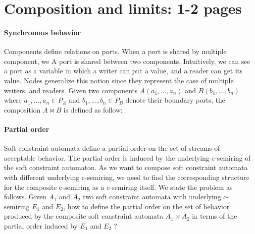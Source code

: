 \section{Composition and limits: 1-2 pages}
\paragraph{Synchronous behavior} Components define relations on ports. When a port is shared by multiple component, we 
A port is shared between two components. Intuitively, we can see a port as a variable in which a writer can put a value, and a reader can get its value. Nodes generalize this notion since they represent the case of multiple writers, and readers. Given two components $A(a_1,...,a_n)$ and $B(b_1,...,b_n)$ where $a_1, ..., a_n \in P_{A}$ and $b_1, ..., b_n \in P_{B}$ denote their boundary ports, the composition $A \bowtie B$ is defined as follow:


\paragraph{Partial order}
Soft constraint automata define a partial order on the set of streams of acceptable behavior. The partial order is induced by the underlying c-semiring of the soft constraint automaton. As we want to compose soft constraint automata with different underlying c-semiring, we need to find the corresponding structure for the composite c-semiring as a c-semiring itself. We state the problem as follows. Given $A_1$ and $A_2$ two soft constraint automata with underlying c-semiring $E_1$ and $E_2$, how to define the partial order on the set of behavior produced by the composite soft constraint automata $A_1 \bowtie A_2$ in terms of the partial order induced by $E_1$ and $E_2$ ?
